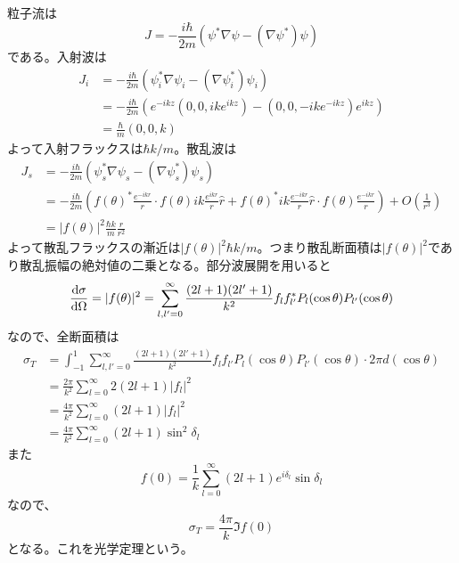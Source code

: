     粒子流は
        \[J = -\frac{i\hbar}{2m}(\psi^*\nabla\psi - (\nabla\psi^*)\psi)\]
    である。入射波は
    \begin{align*}
        J_i &= -\frac{i\hbar}{2m}(\psi_i^*\nabla\psi_i - (\nabla\psi_i^*)\psi_i)\\
            &= -\frac{i\hbar}{2m}(e^{-ikz}(0, 0, ike^{ikz}) - (0, 0, -ike^{-ikz})e^{ikz})\\
            &= \frac{\hbar}{m}(0, 0, k)
    \end{align*}
    よって入射フラックスは$\hbar k / m$。散乱波は
    \begin{align*}
        J_s &= -\frac{i\hbar}{2m}(\psi_s^*\nabla\psi_s - (\nabla\psi_s^*)\psi_s)\\
            &= -\frac{i\hbar}{2m}\left(f(\theta)^*\frac{e^{-ikr}}{r} \cdot f(\theta)ik\frac{e^{ikr}}{r}\hat{r} + f(\theta)^*ik\frac{e^{-ikr}}{r}\hat{r} \cdot f(\theta)\frac{e^{-ikr}}{r}\right) + O\left(\frac{1}{r^3}\right)\\
            &= |f(\theta)|^2\frac{\hbar k}{m}\frac{\hat{r}}{r^2}
    \end{align*}
    よって散乱フラックスの漸近は$|f(\theta)|^2\hbar k / m$。つまり散乱断面積は$|f(\theta)|^2$であり散乱振幅の絶対値の二乗となる。部分波展開を用いると
        \[\dv{\sigma}{\Omega} = |f(\theta)|^2
            = \sum_{l, l' = 0}^\infty \frac{(2l + 1)(2l' + 1)}{k^2}f_lf_{l'}^*P_l(\cos\theta)P_{l'}(\cos\theta)\]
    なので、全断面積は
    \begin{align*}
        \sigma_T
            &= \int_{-1}^1 \sum_{l, l' = 0}^\infty \frac{(2l + 1)(2l' + 1)}{k^2}f_lf_{l'}P_l(\cos\theta)P_{l'}(\cos\theta) \cdot 2\pi d(\cos\theta)\\
            &= \frac{2\pi}{k^2} \sum_{l = 0}^\infty 2(2l + 1)|f_l|^2\\
            &= \frac{4\pi}{k^2} \sum_{l = 0}^\infty (2l + 1)|f_l|^2\\
            &= \frac{4\pi}{k^2} \sum_{l = 0}^\infty (2l + 1)\sin^2\delta_l
    \end{align*}
    また
        \[f(0) = \frac{1}{k}\sum_{l = 0}^\infty (2l + 1)e^{i\delta_l}\sin\delta_l\]
    なので、
        \[\sigma_T = \frac{4\pi}{k}\Im f(0)\]
    となる。これを光学定理という。